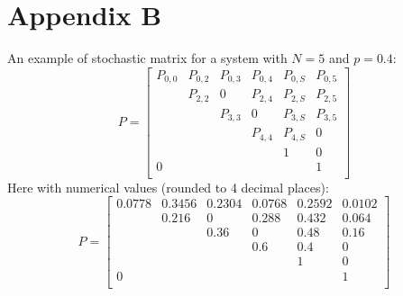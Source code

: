 \section{Appendix B}
\label{app:b}
An example of stochastic matrix for a system with $N = 5$ and $p = 0.4$:
\begin{equation*}
P = 
\begin{bmatrix}
P_{0,0}	& P_{0,2}	& P_{0,3}  	& P_{0, 4}	& P_{0,S}	& P_{0,5} \\
		& P_{2,2}	& 0  		& P_{2, 4}	& P_{2,S}	& P_{2,5} \\
		& 			& P_{3,3}	& 0			& P_{3,S}	& P_{3,5} \\
		& 			& 			& P_{4,4}	& P_{4,S}	& 0\\
		& 			& 			& 			& 1			& 0\\
0		& 			& 		  	& 			& 			& 1\\
\end{bmatrix}
\label{exampleMatrix}
\end{equation*}
Here with numerical values (rounded to 4 decimal places):
\begin{equation*}
P = 
\begin{bmatrix}
0.0778	& 0.3456	& 0.2304  	& 0.0768	& 0.2592	& 0.0102 \\
		& 0.216		& 0  		&0.288		& 0.432		& 0.064 \\
		& 			& 0.36		& 0			& 0.48		& 0.16 \\
		& 			& 			& 0.6		& 0.4		& 0\\
		& 			& 			& 			& 1			& 0\\
0		& 			& 		  	& 			& 			& 1\\
\end{bmatrix}
\label{exampleMatrixValues}
\end{equation*}
\newpage
